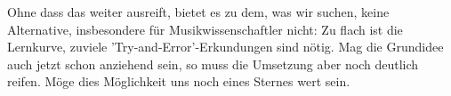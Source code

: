 Ohne dass das  weiter ausreift, bietet es zu dem, was wir suchen,
keine Alternative, insbesondere für Musikwissenschaftler nicht: Zu flach ist die
Lernkurve, zuviele 'Try-and-Error'-Erkundungen sind nötig. Mag die Grundidee
auch jetzt schon anziehend sein, so muss die Umsetzung aber noch deutlich
reifen. Möge dies Möglichkeit uns noch eines Sternes wert sein.
%
